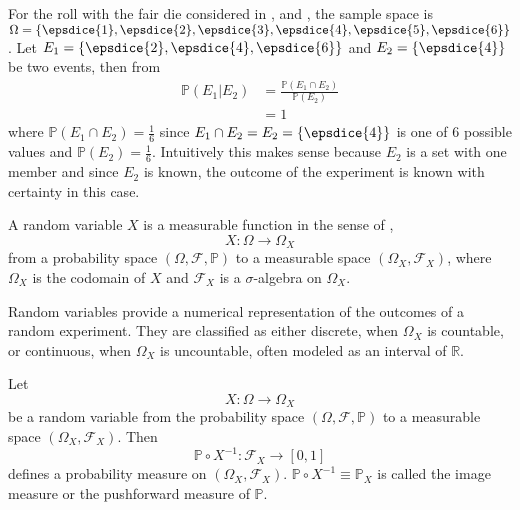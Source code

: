 \begin{example}
	For the roll with the fair die considered in ,  and , the sample space is $\Omega = \{ \epsdice{1}, \epsdice{2}, \epsdice{3}, \epsdice{4}, \epsdice{5}, \epsdice{6} \}$. Let $E_1 = \{\epsdice{2}, \epsdice{4}, \epsdice{6}\}$ and $E_2 = \{\epsdice{4}\}$ be two events, then from 
	\begin{equation}
		\begin{split}
			\mathbb{P}(E_1|E_2) &= \frac{\mathbb{P}(E_1 \cap E_2)}{\mathbb{P}(E_2)}\\
			& = 1
		\end{split}
	\end{equation}
	where $\mathbb{P}(E_1 \cap E_2)= \frac{1}{6}$ since $E_1\cap E_2 = E_2=\{\epsdice{4}\}$ is one of $6$ possible values and $\mathbb{P}(E_2) = \frac{1}{6}$. Intuitively this makes sense because $E_2$ is a set with one member and since $E_2$ is known, the outcome of the experiment is known with certainty in this case.
\end{example}

\begin{definition}
	\label{def:random_Variable}
	A random variable $X$ is a measurable function in the sense of ,
	\begin{equation}
		X: \Omega \to \Omega_X
	\end{equation}
	from a probability space $(\Omega, \mathcal{F}, \mathbb{P})$ to a measurable space $(\Omega_X, \mathcal{F}_X)$, where $\Omega_X$ is the codomain of $X$ and $\mathcal{F}_X$ is a $\sigma$-algebra on $\Omega_X$.
\end{definition}

\begin{remark}
	Random variables provide a numerical representation of the outcomes of a random experiment.  
	They are classified as either discrete, when $\Omega_X$ is countable, or continuous, when $\Omega_X$ is uncountable, often modeled as an interval of $\mathbb{R}$.
\end{remark}

\begin{definition}
	\label{def:image_measure}
	Let 
	\begin{equation}
		X: \Omega \to \Omega_X
	\end{equation}
	be a random variable from the probability space $(\Omega, \mathcal{F}, \mathbb{P})$ to a measurable space $(\Omega_X, \mathcal{F}_X)$. Then~\cite{drewitz2019introduction}
	\begin{equation}
		\mathbb{P}\circ X^{-1}: \mathcal{F}_X\to [0,1]
	\end{equation}
	defines a probability measure on $(\Omega_X, \mathcal{F}_X)$. $\mathbb{P}\circ X^{-1} \equiv \mathbb{P}_X$ is called the image measure or the pushforward measure of $\mathbb{P}$.
\end{definition}

